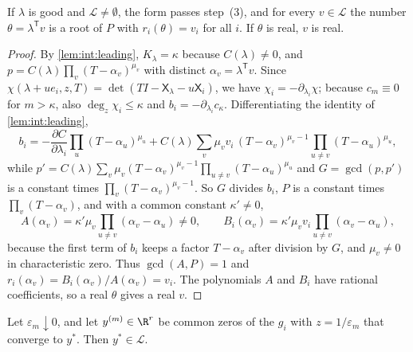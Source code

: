 \begin{lemma}\label{lem:int:recovery}
If $\lambda$ is good and $\mathcal L\ne\emptyset$, the form passes step~(3), and
for every $v\in\mathcal L$ the number $\theta=\lambda^{\mathsf T}v$ is a root of
$P$ with $r_i(\theta)=v_i$ for all $i$. If $\theta$ is real, $v$ is real.
\end{lemma}

\begin{proof}
By \cref{lem:int:leading}, $K_\lambda=\kappa$ because $C(\lambda)\ne0$, and
$p=C(\lambda)\prod_v(T-\alpha_v)^{\mu_v}$ with distinct $\alpha_v=\lambda^{\mathsf T}v$.
Since $\chi(\lambda+ue_i,z,T)=\det(TI-\mathsf X_\lambda-u\mathsf X_i)$, we have
$\chi_i=-\partial_{\lambda_i}\chi$; because $c_m\equiv0$ for $m>\kappa$, also
$\deg_z\chi_i\le\kappa$ and $b_i=-\partial_{\lambda_i}c_\kappa$. Differentiating
the identity of \cref{lem:int:leading},
\[
 b_i=-\frac{\partial C}{\partial\lambda_i}\prod_u(T-\alpha_u)^{\mu_u}
 +C(\lambda)\sum_v\mu_vv_i\,(T-\alpha_v)^{\mu_v-1}\prod_{u\ne v}(T-\alpha_u)^{\mu_u},
\]
while $p'=C(\lambda)\sum_v\mu_v(T-\alpha_v)^{\mu_v-1}\prod_{u\ne v}(T-\alpha_u)^{\mu_u}$
and $G=\gcd(p,p')$ is a constant times $\prod_v(T-\alpha_v)^{\mu_v-1}$. So $G$
divides $b_i$, $P$ is a constant times $\prod_v(T-\alpha_v)$, and with a common
constant $\kappa'\ne0$,
\[
 A(\alpha_v)=\kappa'\mu_v\prod_{u\ne v}(\alpha_v-\alpha_u)\ne0,\qquad
 B_i(\alpha_v)=\kappa'\mu_vv_i\prod_{u\ne v}(\alpha_v-\alpha_u),
\]
because the first term of $b_i$ keeps a factor $T-\alpha_v$ after division by
$G$, and $\mu_v\ne0$ in characteristic zero. Thus $\gcd(A,P)=1$ and
$r_i(\alpha_v)=B_i(\alpha_v)/A(\alpha_v)=v_i$. The polynomials $A$ and $B_i$ have
rational coefficients, so a real $\theta$ gives a real $v$.
\end{proof}

\begin{lemma}\label{lem:int:limits}
Let $\varepsilon_m\downarrow0$, and let $y^{(m)}\in\R^r$ be common zeros of the
$g_i$ with $z=1/\varepsilon_m$ that converge to $y^*$. Then $y^*\in\mathcal L$.
\end{lemma}

